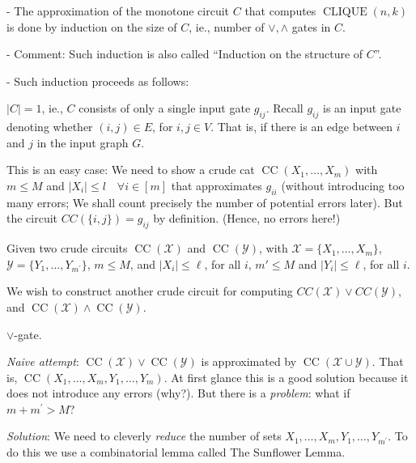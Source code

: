 
- The approximation of the monotone circuit $C$ that computes $\operatorname{CLIQUE}(n, k)$ is done by induction on the size of $C$, ie., number of $\lor, \wedge$ gates in $C$.


- Comment: Such induction is also called ``Induction on the structure of $C$''.

- Such induction proceeds as follows: 


 $|C|=1$, ie., $C$ consists of only a single input gate $g_{ij}$. Recall $g_{i j}$ is an input gate denoting whether $(i, j) \in E$, for $i, j \in V$.
That is, if there is an edge between $i$ and $j$ in the input graph $G$.

This is an easy case: We need to show a crude cat $\operatorname{CC}\left(X_1, \ldots, X_m\right)$ with $m \leqslant M$ and $\left|X_i\right| \leqslant l \quad \forall i \in[m]$ that
approximates $g_{i i}$ (without introducing too many errors; We shall count precisely the number of potential errors later).
But the circuit $C C(\{i, j\})=g_{i j}$ by definition. (Hence, no errors here!)


Given two crude circuits
$\operatorname{CC}(\mathcal X)$ and 
$\operatorname{CC}(\mathcal Y) 
$, with $\mathcal{X}=\{X_1, \ldots, X_m\}$, 
$\mathcal{Y}=\{Y_1, \ldots, Y_{m^{\prime}}\}$, $m\le M$, and $\left|X_i\right| \leq \ell $, for all $i$, $m'\le M $ and $\left|Y_i\right| \leq \ell$, for all $i$.


We wish to construct another crude circuit  for computing $CC(\mathcal{X}) \vee CC(\mathcal{Y})$, and $\operatorname{CC}(\mathcal X) \wedge 
\operatorname{CC}(\mathcal Y)$.

$\lor$-gate.

\textit{Naive attempt}: $\operatorname{CC}(\mathcal X)
\lor \operatorname{CC}(\mathcal Y)$ is approximated by $\operatorname{CC}(\mathcal X \cup \mathcal Y)$. That is, $\operatorname{CC}\left(X_1, \ldots, X_m, Y_1, \ldots, Y_m\right)$. At first glance this is a good solution because it does not introduce any errors (why?). But there is a \textit{problem}: what if $m+m^{\prime}>M$?


\textit{Solution}: We need to cleverly \emph{reduce} the number of sets $X_1, \ldots, X_m, Y_1, \ldots, Y_{m^{\prime}}$. To do this we use a combinatorial lemma called The Sunflower Lemma.





